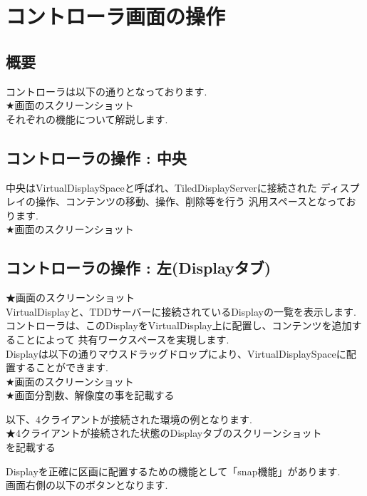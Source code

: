 \documentclass[a4paper,10pt,oneside]{jsbook}
\begin{document}
\chapter{コントローラ画面の操作}
\section{概要}
コントローラは以下の通りとなっております.\\
★画面のスクリーンショット\\

それぞれの機能について解説します.\\

\newpage

\section{コントローラの操作 : 中央}
中央はVirtualDisplaySpaceと呼ばれ、TiledDisplayServerに接続された
ディスプレイの操作、コンテンツの移動、操作、削除等を行う
汎用スペースとなっております.\\

★画面のスクリーンショット\\


\newpage

\section{コントローラの操作 : 左(Displayタブ)}
★画面のスクリーンショット\\
VirtualDisplayと、TDDサーバーに接続されているDisplayの一覧を表示します.\\
コントローラは、このDisplayをVirtualDisplay上に配置し、コンテンツを追加することによって
共有ワークスペースを実現します.\\
Displayは以下の通りマウスドラッグドロップにより、VirtualDisplaySpaceに配置することができます.\\

★画面のスクリーンショット\\

★画面分割数、解像度の事を記載する



以下、4クライアントが接続された環境の例となります.\\
★4クライアントが接続された状態のDisplayタブのスクリーンショット\\を記載する


Displayを正確に区画に配置するための機能として「snap機能」があります.\\
画面右側の以下のボタンとなります.\\
\end{document}
